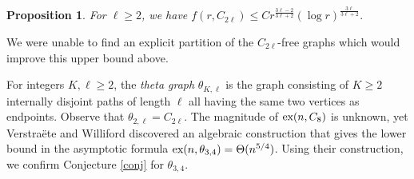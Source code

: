 \documentclass[12pt]{article}%
\newtheorem{theorem}{Theorem}[section]
\newtheorem{proposition}[theorem]{Proposition}
\begin{document}
\begin{proposition} \label{general even cycles result}
For $\ell\ge 2$, we have $f(r,C_{2\ell})\le Cr^{\frac{3\ell-2}{3\ell+2}}(\log r)^{\frac{3\ell}{3\ell+2}}.$
\end{proposition}

We were unable to find an explicit partition of the $C_{2\ell}$-free graphs which would improve this upper bound above.

For integers $K , \ell \geq 2$, the \emph{theta graph} $\theta_{K,\ell }$ is the graph consisting of $K \geq 2$ internally disjoint paths of length $\ell$ all having the same two vertices as endpoints.  Observe that $\theta_{2, \ell} = C_{ 2 \ell}$.  The magnitude of $\textup{ex}(n, C_8)$ is unknown, yet Verstra\"{e}te and Williford \cite{VerWilliford} discovered an algebraic construction that gives the lower bound in the asymptotic formula $\textup{ex}(n, \theta_{3,4} ) = \Theta(n^{5/4})$.  Using their construction, we confirm Conjecture \ref{conj} for $\theta_{3,4}$.  
\end{document}
